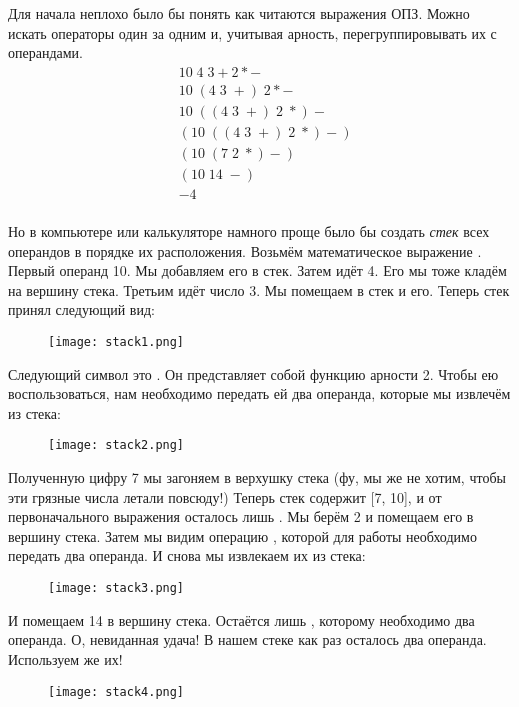 Для начала неплохо было бы понять как читаются выражения ОПЗ.
Можно искать операторы один за одним и, учитывая арность, перегруппировывать их с операндами.
\begin{align*}
    &10\;4\;3+2 * -\\
    &10\;(4\;3\; +)\;2 * -\\
    &10\; ((4\; 3\; +)\; 2\; *) -\\ 
    &(10\; ((4\; 3\; +)\; 2\; *) -)\\
    &(10\; (7\; 2\; *) -)\\
    &(10\; 14\; -)\\
    &-4\\
\end{align*}

Но в компьютере или калькуляторе намного проще было бы создать \emph{стек} всех операндов в порядке их расположения.
Возьмём математическое выражение .
Первый операнд 10.
Мы добавляем его в стек.
Затем идёт 4.
Его мы тоже кладём на вершину стека.
Третьим идёт число 3.
Мы помещаем в стек и его.
Теперь стек принял следующий вид:
\begin{figure}[h!]
    \centering
    \texttt{[image: stack1.png]}
\end{figure}

Следующий символ это \ops{+\strut}.
Он представляет собой функцию арности 2.
Чтобы ею воспользоваться, нам необходимо  передать ей два операнда, которые мы извлечём из стека:
\begin{figure}[h!]
    \centering
    \texttt{[image: stack2.png]}
\end{figure}

Полученную цифру 7 мы загоняем в верхушку стека (фу, мы же не хотим, чтобы эти грязные числа летали повсюду!)
Теперь стек содержит [7, 10], и от первоначального выражения осталось лишь .
Мы берём 2 и помещаем его в вершину стека.
Затем мы видим операцию \ops{*\strut}, которой для работы необходимо передать два операнда.
И снова мы извлекаем их из стека:
\begin{figure}[h!]
    \centering
    \texttt{[image: stack3.png]}
\end{figure}

И помещаем 14 в вершину стека.
Остаётся лишь \ops{-\strut}, которому необходимо два операнда.
О, невиданная удача!
В нашем стеке как раз осталось два операнда.
Используем же их!
\begin{figure}[h!]
    \centering
    \texttt{[image: stack4.png]}
\end{figure}

